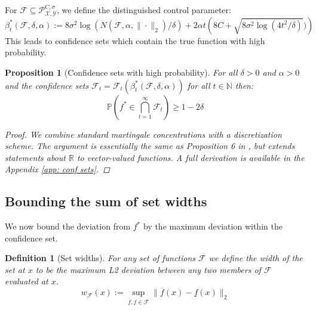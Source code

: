 \documentclass{article}
\newtheorem{mydef}{Definition}
\newtheorem{prop}{Proposition}
\newcommand{\Prob}{\mathds{P}}
\newcommand{\Real}{\mathds{R}}
\newcommand{\Nat}{\mathbb{N}}
\newcommand{\Xc}{\mathcal{X}}
\newcommand{\Yc}{\mathcal{Y}}
\newcommand{\Pc}{\mathcal{P}}
\newcommand{\Fc}{\mathcal{F}}
\begin{document}
For $\Fc \subseteq \Pc^{C,\sigma}_{\Xc,\Yc}$, we define the distinguished control parameter:
\begin{equation}
\label{eq: beta star}
	\beta^*_t(\Fc,\delta,\alpha) := 8 \sigma^2 \log(N(\Fc,\alpha,\|\cdot\|_2)/\delta) +
	2 \alpha t \left(8C + \sqrt{8\sigma^2 \log(4t^2/\delta)}) \right)
\end{equation}
This leads to confidence sets which contain the true function with high probability.

\begin{prop}[Confidence sets with high probability]
\label{prop: conf sets} \hspace{0.00000000000001mm} \newline
For all $\delta>0$ and $\alpha >0$ and the confidence sets $\Fc_t = \Fc_t(\beta^*_t(\Fc,\delta,\alpha))$ for all $t \in \Nat$ then:
$$\Prob \left( f^* \in \bigcap_{t=1}^\infty \Fc_t \right) \ge 1-2\delta $$
\begin{proof}
We combine standard martingale concentrations with a discretization scheme.
The argument is essentially the same as Proposition 6 in \cite{russo2013}, but extends statements about $\Real$ to vector-valued functions.
A full derivation is available in the Appendix \ref{app: conf sets}.
\end{proof}
\end{prop}

\subsection{Bounding the sum of set widths}
We now bound the deviation from $f^*$ by the maximum deviation within the confidence set.

\begin{mydef}[Set widths]
\hspace{0.00000000000001mm} \newline
For any set of functions $\Fc$ we define the width of the set at $x$ to be the maximum L2 deviation between any two members of $\Fc$ evaluated at $x$.
$$ w_\Fc(x) := \sup_{\overline{f},\underline{f} \in \Fc} \| \overline{f}(x) - \underline{f}(x)\|_2$$
\end{mydef}
\end{document}
